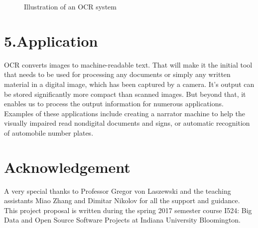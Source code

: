 \documentclass[9pt,twocolumn,twoside]{styles/osajnl}
\begin{document}
\begin{figure}
\centering
{}
\caption{Illustration of an OCR system \cite{www-ocr-image}}
\label{fig:Illustration of an OCR system}
\end{figure}

\section{5.Application}

OCR converts images to machine-readable text. That will make it the
initial tool that needs to be used for processing any documents or
simply any written material in a digital image, which has been
captured by a camera\cite{www-ocr-wiki}. It’s output can be stored significantly more
compact than scanned images. But beyond that, it enables us to process
the output information for numerous applications. Examples of these
applications include creating a narrator machine to help the visually
impaired read nondigital documents and signs, or automatic recognition
of automobile number plates.

\section{Acknowledgement}
A very special thanks to Professor Gregor von Laszewski and the
teaching assistants Miao Zhang and Dimitar Nikolov for all the support
and guidance. This project proposal is written during the spring 2017
semester course {I524: Big Data and Open Source Software Projects} at
Indiana University Bloomington.


\end{document}
